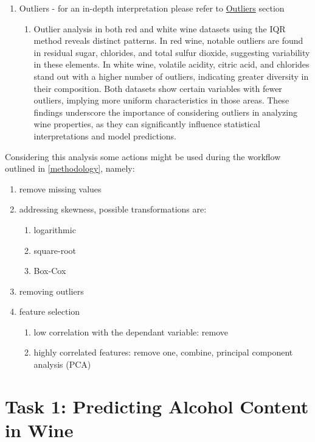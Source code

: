 \documentclass{article}
\begin{document}
\begin{enumerate}
    \item Outliers - for an in-depth interpretation please refer to \href{https://github.com/hjoaquim/applied-ai/blob/main/wine-analysis/exploratory-analysis.ipynb}{Outliers} section
        \begin{enumerate}
            \item Outlier analysis in both red and white wine datasets using the IQR method reveals distinct patterns. In red wine, notable outliers are found in residual sugar, chlorides, and total sulfur dioxide, suggesting variability in these elements. In white wine, volatile acidity, citric acid, and chlorides stand out with a higher number of outliers, indicating greater diversity in their composition. Both datasets show certain variables with fewer outliers, implying more uniform characteristics in those areas. These findings underscore the importance of considering outliers in analyzing wine properties, as they can significantly influence statistical interpretations and model predictions.
        \end{enumerate}
\end{enumerate}

Considering this analysis some actions might be used during the workflow outlined in \ref{methodology}, namely:
\begin{enumerate}
    \item remove missing values
    \item addressing skewness, possible transformations are:
        \begin{enumerate}
            \item logarithmic
            \item square-root
            \item Box-Cox
        \end{enumerate}
    \item removing outliers
    \item feature selection
        \begin{enumerate}
            \item low correlation with the dependant variable: remove
            \item highly correlated features: remove one, combine, principal component analysis (PCA)
        \end{enumerate}
\end{enumerate}

\section{Task 1: Predicting Alcohol Content in Wine}
\end{document}
